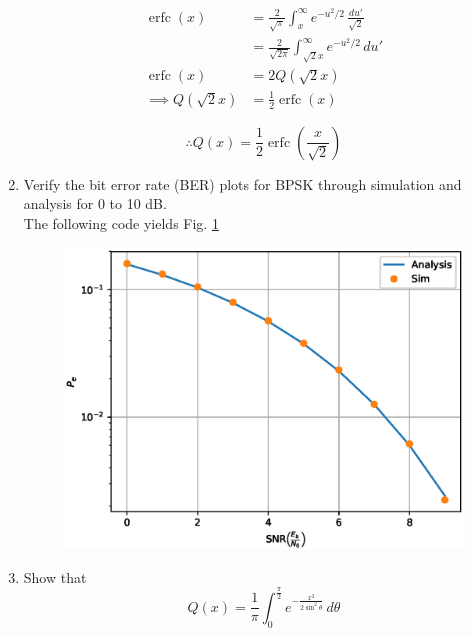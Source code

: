 \documentclass[10pt, a4paper]{article}
\begin{document}
\begin{enumerate}
\begin{align}
\operatorname {erfc} (x)&={\frac {2}{\sqrt {\pi }}}\int _{x}^{\infty }e^{-u^{2}/2}\,\frac{du'}{\sqrt{2}}  \\
&={\frac {2}{\sqrt {2\pi }}}\int _{\sqrt{2}x}^{\infty }e^{-u^{2}/2}\,du'\\
\operatorname {erfc} (x)&=2Q(\sqrt{2}x)\\
\implies Q(\sqrt{2}x)&=\frac{1}{2}\operatorname {erfc} (x)
\end{align}


\begin{equation}
\therefore Q(x) = \frac{1}{2}\operatorname {erfc}\left({\frac  {x}{{\sqrt  {2}}}}\right)
\end{equation}


\item
Verify the bit error rate (BER) plots for BPSK through simulation and analysis for 0 to 10 dB. \\
\solution
The following code yields Fig. \ref{fig:bpsk_ber}
\begin{center}
\end{center}
\begin{figure}[!h]
\centering
\includegraphics[width=\columnwidth]{images/bpsk2.eps}
\caption{}
\label{fig:bpsk_ber}
\end{figure}
\item
Show that
\begin{equation}
Q(x) = \frac{1}{\pi}\int^{\frac{\pi}{2}}_{0}e^{-\frac{x^2}{2\sin^2 \theta}}\,d\theta

\end{equation}
\end{enumerate}
\end{document}
